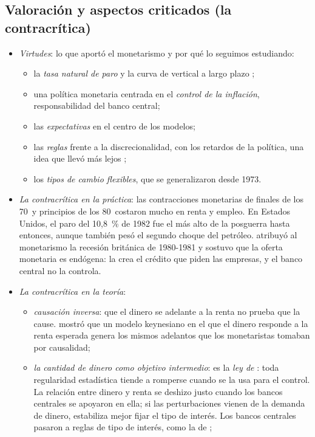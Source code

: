 \documentclass[11pt]{article}
\begin{document}
\subsection{Valoración y aspectos criticados (la contracrítica)}\label{sec:valoracion}

\begin{itemize}
\item \emph{Virtudes}: lo que aportó el monetarismo y por qué lo seguimos estudiando:
  \begin{itemize}
  \item la \emph{tasa natural de paro} y la curva de  vertical a largo plazo ;
  \item una política monetaria centrada en el \emph{control de la inflación}, responsabilidad del banco central;
  \item las \emph{expectativas} en el centro de los modelos;
  \item las \emph{reglas} frente a la discrecionalidad, con los retardos de la política, una idea que llevó más lejos ;
  \item los \emph{tipos de cambio flexibles}, que se generalizaron desde 1973.
  \end{itemize}
\item \emph{La contracrítica en la práctica}: las contracciones monetarias de finales de los 70~y principios de los 80~costaron mucho en renta y empleo. En Estados Unidos, el paro del 10,8~\% de 1982 fue el más alto de la posguerra hasta entonces\nocite{BLS2026UNRATE}, aunque también pesó el segundo choque del petróleo. \textcite{Kaldor1970New,Kaldor1982Scourge} atribuyó al monetarismo la recesión británica de 1980-1981 y sostuvo que la oferta monetaria es endógena: la crea el crédito que piden las empresas, y el banco central no la controla.
\item \emph{La contracrítica en la teoría}:
  \begin{itemize}
  \item \emph{causación inversa}: que el dinero se adelante a la renta no prueba que la cause. \textcite{Tobin1970Money} mostró que un modelo keynesiano en el que el dinero responde a la renta esperada genera los mismos adelantos que los monetaristas tomaban por causalidad;
  \item \emph{la cantidad de dinero como objetivo intermedio}: es la \emph{ley de }: toda regularidad estadística tiende a romperse cuando se la usa para el control\nocite{Goodhart1975Problems}. La relación entre dinero y renta se deshizo justo cuando los bancos centrales se apoyaron en ella; si las perturbaciones vienen de la demanda de dinero, estabiliza mejor fijar el tipo de interés\nocite{Poole1970Optimal}. Los bancos centrales pasaron a reglas de tipo de interés, como la de  ;

\end{itemize}
\end{itemize}
\end{document}
